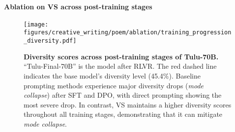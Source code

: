 \paragraph{Ablation on VS across post-training stages} 
\begin{wrapfigure}{r}{0.50\textwidth}
    \captionsetup{skip=2pt} 
    \vspace{-1.4em}
    \centering
    \texttt{[image: figures/creative\_writing/poem/ablation/training\_progression\_diversity.pdf]}
    \caption{
    \textbf{Diversity scores across post-training stages of Tulu-70B.} ``Tulu-Final-70B'' is the model after RLVR. The red dashed line indicates the base model's diversity level (45.4\%). Baseline
  prompting methods experience major diversity drops (\textit{mode collapse}) after SFT and DPO, 
  with direct prompting showing the most severe drop. In contrast, VS maintains a higher
  diversity scores throughout all training stages, demonstrating that it can mitigate \emph{mode collapse}.
  \vspace{-1em}
    }
    \label{fig:training_progression}
\end{wrapfigure}

